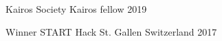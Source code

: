 



\begin{cvhonors}

  \cvhonor
    {Kairos Society} %
    {Kairos fellow} %
    {} %
    {2019} %

  \cvhonor
    {Winner} %
    {START Hack} %
    {St. Gallen Switzerland} %
    {2017} %


\end{cvhonors}
